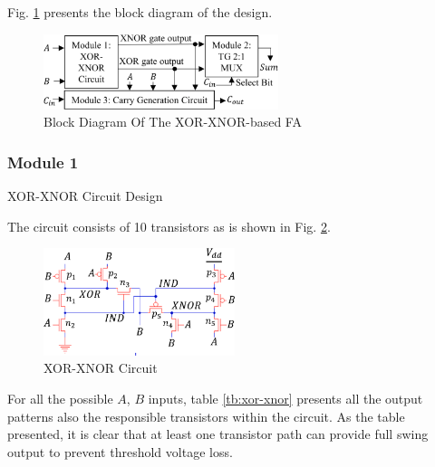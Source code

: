 \documentclass[conference]{IEEEtran}
\begin{document}
Fig. \ref{fig:fa1-bd} presents the block diagram of the design.

\begin{figure}[!ht]
	\centering
	\includegraphics[width=2.7in]{fa1-block diagram.png}
	\caption{Block Diagram Of The XOR-XNOR-based FA}
	\label{fig:fa1-bd}
\end{figure}

\subsubsection{Module 1}XOR-XNOR Circuit Design

The circuit consists of 10 transistors as is shown in Fig. \ref{fig:fa1-xor-xnor}.

\begin{figure}[!ht]
	\centering
	\includegraphics[width=2.2in]{fa1-xor-xnor circuit.png}
	\caption{XOR-XNOR Circuit}
	\label{fig:fa1-xor-xnor}
\end{figure}

For all the possible \(A\), \(B\) inputs,
table \ref{tb:xor-xnor} presents all the output patterns also the responsible transistors within the circuit.
As the table presented, it is clear that at least one transistor path can provide full swing output to prevent threshold voltage loss.
\end{document}

